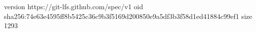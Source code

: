 version https://git-lfs.github.com/spec/v1
oid sha256:74e63e4595ff8b5425c36c9b3f5169d200850e9a5df3b3f58d1ed41884c99ef1
size 1293
